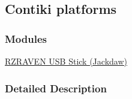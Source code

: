 \hypertarget{a00065}{}\subsection{Contiki platforms}
\label{a00065}
\subsubsection*{Modules}
\begin{DoxyCompactItemize}
\item 
\hyperlink{a00067}{R\+Z\+R\+A\+V\+E\+N U\+S\+B Stick (\+Jackdaw)}
\end{DoxyCompactItemize}


\subsubsection{Detailed Description}
